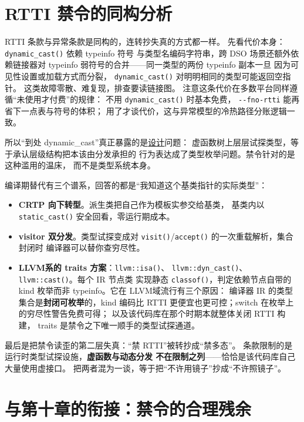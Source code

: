 \documentclass[12pt,a4paper,fontset=fandol]{ctexbook}
\newcommand{\Fn}[1]{\texttt{#1()}}
\newcommand{\Opt}[1]{\texttt{-\/-#1}}
\newcommand{\Bk}{\discretionary{}{}{}}
\newcommand{\Lang}[1]{\textsf{#1}}
\newcommand{\DomLlvm}{\Lang{LLVM}}
\begin{document}
\section{RTTI 禁令的同构分析}
\label{sec:ch11-rtti}

RTTI 条款与异常条款是同构的，连转抄失真的方式都一样。
先看代价本身：\Fn{dynamic{\Bk}\_cast} 依赖 typeinfo 符号
与类型名编码字符串，跨 DSO 场景还额外依赖链接器对
typeinfo 弱符号的合并——同一类型的两份 typeinfo 副本一旦
因为可见性设置或加载方式而分裂，
\Fn{dynamic{\Bk}\_cast} 对明明相同的类型可能返回空指针。
这类故障零散、难复现，排查要读链接图。
注意这条代价在多数平台同样遵循``未使用才付费''的规律：
不用 \Fn{dynamic{\Bk}\_cast} 时基本免费，
\Opt{fno-rtti} 能再省下一点表与符号的体积；
用了才谈代价，这与异常模型的冷热路径分账逻辑一致。

所以``到处 dynamic\_cast''真正暴露的是\underline{设计}问题：
虚函数树上层层试探类型，等于承认层级结构把本该由分发承担的
行为表达成了类型枚举问题。禁令针对的是这种滥用的温床，
而不是类型系统本身。

编译期替代有三个谱系，回答的都是``我知道这个基类指针的实际类型''：

\begin{itemize}
\item \textbf{CRTP 向下转型}。派生类把自己作为模板实参交给基类，
基类内以 \Fn{static{\Bk}\_cast} 安全回看，零运行期成本。
\item \textbf{visitor 双分发}。类型试探变成对
\Fn{visit}/{\Bk}\Fn{accept} 的一次重载解析，集合封闭时
编译器可以替你查穷尽性。
\item \textbf{\DomLlvm 系的 traits 方案}：\Fn{llvm::isa}、
\Fn{llvm::dyn{\Bk}\_cast}、\Fn{llvm::cast}。每个 IR 节点类
实现静态 \Fn{classof}，判定依赖节点自带的 kind 枚举而非
typeinfo。它在 \DomLlvm 域流行有三个原因：
编译器 IR 的类型集合是\textbf{封闭可枚举}的，kind 编码比
RTTI 更便宜也更可控；switch 在枚举上的穷尽性警告免费可得；
以及该代码库在那个时期本就整体关闭 RTTI 构建，
traits 是禁令之下唯一顺手的类型试探通道。
\end{itemize}

最后是把禁令读歪的第二层失真：``禁 RTTI''被转抄成``禁多态''。
条款限制的是运行时类型试探设施，\textbf{虚函数与动态分发
不在限制之列}——恰恰是该代码库自己大量使用虚接口。
把两者混为一谈，等于把``不许用镜子''抄成``不许照镜子''。

\section{与第十章的衔接：禁令的合理残余}
\label{sec:ch11-residue}
\end{document}
